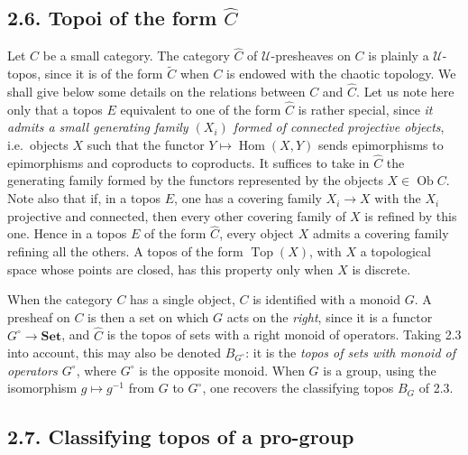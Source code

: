 \documentclass[11pt]{article}
\newcommand{\U}{\mathcal{U}}
\newcommand{\Set}{\mathbf{Set}}
\newcommand{\Top}{\operatorname{Top}}
\newcommand{\Hom}{\operatorname{Hom}}
\newcommand{\Ob}{\operatorname{Ob}}
\newcommand{\ie}{i.e.}
\providecommand{\Ob}{\operatorname{Ob}}
\begin{document}
\subsection*{2.6. Topoi of the form \(\widehat C\)}
Let \(C\) be a small category. The category \(\widehat C\) of \(\U\)-presheaves on \(C\) is plainly a \(\U\)-topos, since it is of the form \(\widetilde C\) when \(C\) is endowed with the chaotic topology. We shall give below some details on the relations between \(C\) and \(\widehat C\). Let us note here only that a topos \(E\) equivalent to one of the form \(\widehat C\) is rather special, since \emph{it admits a small generating family \((X_i)\) formed of connected projective objects}, \ie\ objects \(X\) such that the functor \(Y\mapsto\Hom(X,Y)\) sends epimorphisms to epimorphisms and coproducts to coproducts. It suffices to take in \(\widehat C\) the generating family formed by the functors represented by the objects \(X\in\Ob C\). Note also that if, in a topos \(E\), one has a covering family \(X_i\to X\) with the \(X_i\) projective and connected, then every other covering family of \(X\) is refined by this one. Hence in a topos \(E\) of the form \(\widehat C\), every object \(X\) admits a covering family refining all the others. A topos of the form \(\Top(X)\), with \(X\) a topological space whose points are closed, has this property only when \(X\) is discrete.

When the category \(C\) has a single object, \(C\) is identified with a monoid \(G\). A presheaf on \(C\) is then a set on which \(G\) acts on the \emph{right}, since it is a functor \(G^\circ\to\Set\), and \(\widehat C\) is the topos of sets with a right monoid of operators. Taking 2.3 into account, this may also be denoted \(B_{G^\circ}\): it is the \emph{topos of sets with monoid of operators \(G^\circ\)}, where \(G^\circ\) is the opposite monoid. When \(G\) is a group, using the isomorphism \(g\mapsto g^{-1}\) from \(G\) to \(G^\circ\), one recovers the classifying topos \(B_G\) of 2.3.

\subsection*{2.7. Classifying topos of a pro-group}
\end{document}

